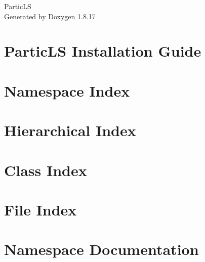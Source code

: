 \let\mypdfximage\pdfximage\def\pdfximage{\immediate\mypdfximage}\documentclass[twoside]{book}
\newcommand{\+}{\discretionary{\mbox{\scriptsize$\hookleftarrow$}}{}{}}
\newcommand{\clearemptydoublepage}{%
  \newpage{\pagestyle{empty}\cleardoublepage}%
}
\begin{document}
\hypersetup{pageanchor=false,
             bookmarksnumbered=true,
             pdfencoding=unicode
            }
\begin{titlepage}
\vspace*{7cm}
\begin{center}%
{\Large Partic\+LS }\\
\vspace*{1cm}
{\large Generated by Doxygen 1.8.17}\\
\end{center}
\end{titlepage}
\clearemptydoublepage
{}
\tableofcontents
\clearemptydoublepage
{}
\hypersetup{pageanchor=true}

\chapter{Partic\+LS Installation Guide}
\label{install}

\chapter{Namespace Index}

\chapter{Hierarchical Index}

\chapter{Class Index}

\chapter{File Index}

\chapter{Namespace Documentation}


\end{document}
